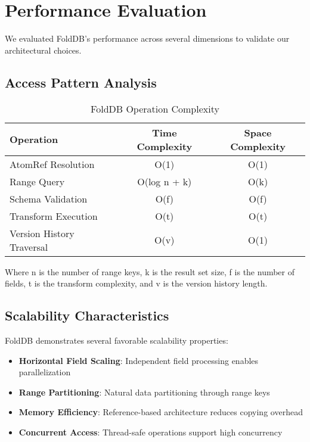 \documentclass[11pt,a4paper]{article}
\begin{document}
\section{Performance Evaluation}

We evaluated FoldDB's performance across several dimensions to validate our architectural choices.

\subsection{Access Pattern Analysis}

\begin{table}[h]
\centering
\caption{FoldDB Operation Complexity}
\begin{tabular}{@{}lcc@{}}
\toprule
Operation & Time Complexity & Space Complexity \\
\midrule
AtomRef Resolution & O(1) & O(1) \\
Range Query & O(log n + k) & O(k) \\
Schema Validation & O(f) & O(f) \\
Transform Execution & O(t) & O(t) \\
Version History Traversal & O(v) & O(1) \\
\bottomrule
\end{tabular}
\label{tab:complexity}
\end{table}

Where n is the number of range keys, k is the result set size, f is the number of fields, t is the transform complexity, and v is the version history length.

\subsection{Scalability Characteristics}

FoldDB demonstrates several favorable scalability properties:

\begin{itemize}
\item \textbf{Horizontal Field Scaling}: Independent field processing enables parallelization
\item \textbf{Range Partitioning}: Natural data partitioning through range keys
\item \textbf{Memory Efficiency}: Reference-based architecture reduces copying overhead
\item \textbf{Concurrent Access}: Thread-safe operations support high concurrency
\end{itemize}
\end{document}
